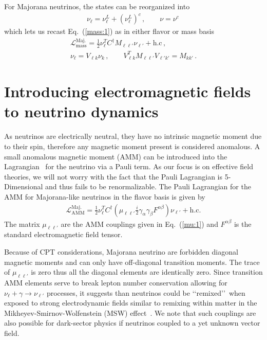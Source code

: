 \documentclass[addchapnum]{ws-rv961x669} %
\newcommand{\req}[1]{Eq.~(\ref{#1})}
\begin{document}
For Majorana neutrinos, the states can be reorganized into
\begin{align}
    \label{maj:1}
    \nu_{\ell} = \nu_{\ell}^{L}+\left(\nu_{\ell}^{L}\right)^{c}\,,\qquad
    \nu=\nu^{c}\,
\end{align}
which lets us recast \req{mass:1} as in either flavor or mass basis
\begin{gather}
    \label{mass:2}
    \mathcal{L}_{\mathrm{mass}}^{\mathrm{Maj.}}=\frac{1}{2}\nu_{\ell}^{T}C^{\dag}M_{\ell\ell'}\nu_{\ell'}+\mathrm{h.c}\,,\\
    \nu_{\ell} = V_{\ell k}\nu_{k}\,,\qquad V_{\ell k}^{T}M_{\ell\ell'}V_{\ell'k'}=M_{kk'}\,.
\end{gather}

\section{Introducing electromagnetic fields to neutrino dynamics}
\label{sec:numoment}
\noindent As neutrinos are electrically neutral, they have no intrinsic magnetic moment due to their spin, therefore any magnetic moment present is considered anomalous. A small anomalous magnetic moment (AMM) can be introduced into the Lagrangian~\citep{Itzykson:1980rh,Steinmetz:2018ryf} for the neutrino via a Pauli term. As our focus is on effective field theories, we will not worry with the fact that the Pauli Lagrangian is 5-Dimensional and thus fails to be renormalizable. The Pauli Lagrangian for the AMM for Majorana-like neutrinos in the flavor basis is given by
\begin{align}
	\label{moment:1} \mathcal{L}_{\mathrm{AMM}}^\mathrm{Maj.}=\frac{1}{2}\nu_{\ell}^{T}C^{\dag}\left(\mu_{\ell\ell'}\frac{i}{2}\gamma_{\alpha}\gamma_{\beta}F^{\alpha\beta}\right)\nu_{\ell'}+\mathrm{h.c.}
\end{align}
The matrix $\mu_{\ell\ell'}$ are the AMM couplings given in \req{mu:1} and $F^{\alpha\beta}$ is the standard electromagnetic field tensor.

Because of CPT considerations, Majorana neutrino are forbidden diagonal magnetic moments and can only have off-diagonal transition moments. The trace of $\mu_{\ell\ell'}$ is zero thus all the diagonal elements are identically zero. Since transition AMM elements serve to break lepton number conservation allowing for $\nu_{\ell}+\gamma\rightarrow\nu_{\ell'}$ processes, it suggests than neutrinos could be \lq\lq remixed\rq\rq\ when exposed to strong electrodynamic fields similar to remixing within matter in the Mikheyev-Smirnov-Wolfenstein (MSW) effect~\citep{Wolfenstein:1977ue,Mikheyev:1985zog,Bethe:1986ej,greiner2009gauge}. We note that such couplings are also possible for dark-sector physics if neutrinos coupled to a yet unknown vector field.
\end{document}

